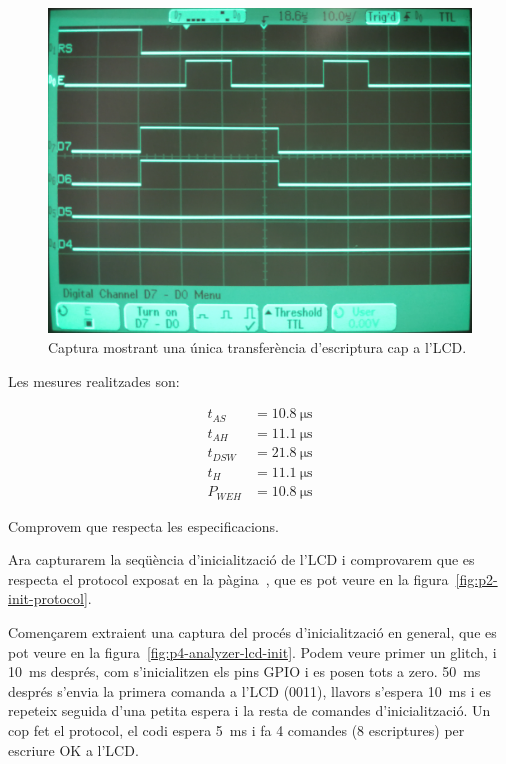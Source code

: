 \begin{figure}
  \begin{center}
    \includegraphics[width=1\columnwidth]{../photos/analyzer/lcd-write}
  \end{center}
  \caption{ \label{fig:p4-analyzer-lcd-write} Captura mostrant una única transferència d'escriptura cap a l'LCD. }
\end{figure}

Les mesures realitzades son:

\begin{align*}
  t_{AS} &= \SI{10.8}{\micro\second}
\\
  t_{AH} &= \SI{11.1}{\micro\second}
\\
  t_{DSW} &= \SI{21.8}{\micro\second}
\\
  t_{H} &= \SI{11.1}{\micro\second}
\\
  P_{WEH} &= \SI{10.8}{\micro\second}
\end{align*}

Comprovem que respecta les especificacions.

Ara capturarem la seqüència d'inicialització de
l'LCD i comprovarem que es respecta el protocol exposat en la pàgina~\pageref{sub:p2-init},
que es pot veure en la figura~\ref{fig:p2-init-protocol}.

Començarem extraient una captura del procés d'inicialització en general, que es pot veure
en la figura~\ref{fig:p4-analyzer-lcd-init}. Podem veure primer un glitch, i \SI{10}{\milli\second}
després, com s'inicialitzen els pins GPIO i es posen tots a zero. \SI{50}{\milli\second} després
s'envia la primera comanda a l'LCD (0011), llavors s'espera \SI{10}{\milli\second} i es repeteix seguida
d'una petita espera i la resta de comandes d'inicialització. Un cop fet el protocol,
el codi espera \SI{5}{\milli\second} i fa 4 comandes (8 escriptures) per escriure OK a l'LCD.

